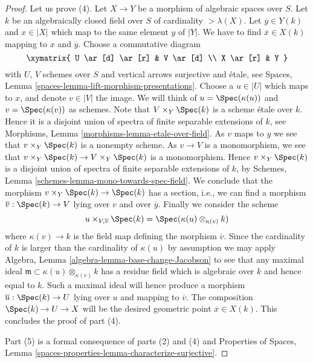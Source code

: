\begin{proof}
\medskip\noindent
Let us prove (4). Let $X \to Y$ be a morphism of algebraic spaces over $S$.
Let $k$ be an algebraically closed field over $S$ of cardinality
$> \lambda(X)$. Let $\overline{y} \in Y(k)$ and $x \in |X|$ which map to the
same element $y$ of $|Y|$.
We have to find $\overline{x} \in X(k)$ mapping to $x$ and $\overline{y}$.
Choose a commutative diagram
$$
\xymatrix{
U \ar[d] \ar[r] & V \ar[d] \\
X \ar[r] & Y
}
$$
with $U$, $V$ schemes over $S$ and vertical arrows surjective
and \'etale, see
Spaces, Lemma \ref{spaces-lemma-lift-morphism-presentations}.
Choose a $u \in |U|$ which maps to $x$, and denote $v \in |V|$ the image.
We will think of $u = \Spec(\kappa(u))$ and
$v = \Spec(\kappa(v))$ as schemes.
Note that $V \times_Y \Spec(k)$ is a scheme \'etale over $k$.
Hence it is a disjoint union of spectra of finite separable
extensions of $k$, see
Morphisms, Lemma \ref{morphisms-lemma-etale-over-field}.
As $v$ maps to $y$ we see that $v \times_Y \Spec(k)$ is a
nonempty scheme. As $v \to V$ is a monomorphism, we see that
$v \times_Y \Spec(k) \to V \times_Y \Spec(k)$
is a monomorphism. Hence $v \times_Y \Spec(k)$ is a disjoint
union of spectra of finite separable extensions of $k$, by
Schemes, Lemma \ref{schemes-lemma-mono-towards-spec-field}.
We conclude that the morphism
$v \times_Y \Spec(k) \to \Spec(k)$
has a section, i.e., we can find a morphism
$\overline{v} : \Spec(k) \to V$ lying over $v$ and over
$\overline{y}$. Finally we consider the scheme
$$
u \times_{V, \overline{v}} \Spec(k)
=
\Spec(\kappa(u) \otimes_{\kappa(v)} k)
$$
where $\kappa(v) \to k$ is the field map defining the morphism
$\overline{v}$. Since the cardinality of $k$ is larger than the cardinality
of $\kappa(u)$ by assumption we may apply
Algebra, Lemma \ref{algebra-lemma-base-change-Jacobson}
to see that any maximal ideal
$\mathfrak m \subset \kappa(u) \otimes_{\kappa(v)} k$
has a residue field which is algebraic over $k$ and hence equal to $k$.
Such a maximal ideal will hence produce a morphism
$\overline{u} : \Spec(k) \to U$ lying over $u$ and mapping to
$\overline{v}$. The composition $\Spec(k) \to U \to X$
will be the desired geometric point $\overline{x} \in X(k)$.
This concludes the proof of part (4).

\medskip\noindent
Part (5) is a formal consequence of parts (2) and (4) and
Properties of Spaces,
Lemma \ref{spaces-properties-lemma-characterize-surjective}.
\end{proof}








